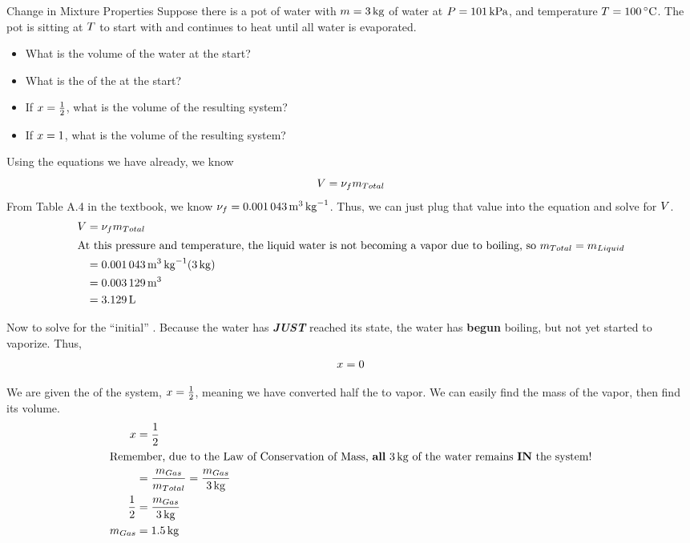 \begin{example}{Change in Mixture Properties}
  Suppose there is a pot of water with $m = \SI{3}{\kilo\gram}$ of water at $P = \SI{101}{\kilo\pascal}$, and temperature $\Temp = \SI{100}{\degreeCelsius}$.
  The pot is sitting at $T$ to start with and continues to heat until all water is evaporated.
  \begin{itemize}[noitemsep]
  \item What is the volume of the water at the start?
  \item What is the  of the  at the start?
  \item If $x=\frac{1}{2}$, what is the volume of the resulting system?
  \item If $x=1$, what is the volume of the resulting system?
  \end{itemize}
  \tcblower{}
  Using the equations we have already, we know
  \begin{equation*}
    V = \nu_{f} m_{Total}
  \end{equation*}
  From Table A.4 in the textbook, we know $\nu_{f} = \SI{0.001043}{\meter\cubed\per\kilo\gram}$.
  Thus, we can just plug that value into the equation and solve for $V$.
  \begin{align*}
    V &= \nu_{f} m_{Total} \\
    \intertext{At this pressure and temperature, the liquid water is not becoming a vapor due to boiling, so $m_{Total} = m_{Liquid}$}
            &= \SI{0.001043}{\meter\cubed\per\kilo\gram} (\SI{3}{\kilo\gram}) \\
            &= \SI{0.003129}{\meter\cubed} \\
            &= \SI{3.129}{\liter}
  \end{align*}

  Now to solve for the ``initial'' .
  Because the water has \textbf{\textit{JUST}} reached its  state, the water has \textbf{begun} boiling, but not yet started to vaporize.
  Thus,
  \begin{equation*}
    x = 0
  \end{equation*}

  We are given the  of the system, $x=\frac{1}{2}$, meaning we have converted half the  to vapor.
  We can easily find the mass of the vapor, then find its volume.
  \begin{align*}
    x &= \frac{1}{2} \\
    \intertext{Remember, due to the Law of Conservation of Mass, \textbf{all} \SI{3}{\kilo\gram} of the water remains \textbf{IN} the system!}
      &= \frac{m_{Gas}}{m_{Total}} = \frac{m_{Gas}}{\SI{3}{\kilo\gram}} \\
    \frac{1}{2} &= \frac{m_{Gas}}{\SI{3}{\kilo\gram}} \\
    m_{Gas} &= \SI{1.5}{\kilo\gram} \\
  \end{align*}


\end{example}
